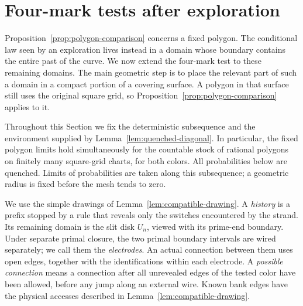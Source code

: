 \section{Four-mark tests after exploration}\label{sec:slits}

Proposition~\ref{prop:polygon-comparison} concerns a fixed polygon.  The
conditional law seen by an exploration lives instead in a domain whose
boundary contains the entire past of the curve.  We now extend the
four-mark test to these remaining domains.  The main geometric step is
to place the relevant part of such a domain in a compact portion of a
covering surface.  A polygon in that surface still uses the original
square grid, so Proposition~\ref{prop:polygon-comparison} applies to it.

Throughout this Section we fix the deterministic subsequence and the
environment supplied by Lemma~\ref{lem:quenched-diagonal}.  In particular,
the fixed polygon limits hold simultaneously for the countable stock
of rational polygons on finitely many square-grid charts, for both
colors.  All probabilities below are quenched.  Limits of probabilities
are taken along this subsequence; a geometric radius is fixed before
the mesh tends to zero.

We use the simple drawings of Lemma~\ref{lem:compatible-drawing}.  A
\emph{history} is a prefix stopped by a rule that reveals only the
switches encountered by the strand.  Its remaining domain is the
slit disk $U_n$, viewed with its prime-end boundary.  Under separate
primal closure, the two primal boundary intervals are wired separately;
we call them the \emph{electrodes}.  An actual connection between them
uses open edges, together with the identifications within each
electrode.  A \emph{possible connection} means a connection after all
unrevealed edges of the tested color have been allowed, before any
jump along an external wire.  Known bank edges have the physical
accesses described in Lemma~\ref{lem:compatible-drawing}.

